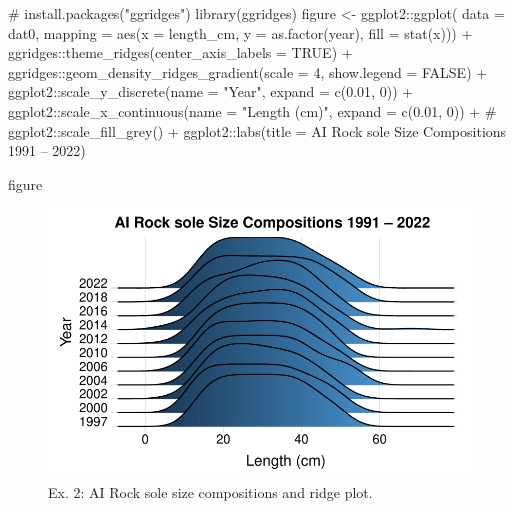 \documentclass[
  letterpaper,
  oneside,
  open=any]{scrbook}
\newenvironment{Shaded}{\begin{snugshade}}{\end{snugshade}}
\newcommand{\AttributeTok}[1]{\textcolor[rgb]{0.40,0.45,0.13}{#1}}
\newcommand{\CommentTok}[1]{\textcolor[rgb]{0.37,0.37,0.37}{#1}}
\newcommand{\ConstantTok}[1]{\textcolor[rgb]{0.56,0.35,0.01}{#1}}
\newcommand{\DecValTok}[1]{\textcolor[rgb]{0.68,0.00,0.00}{#1}}
\newcommand{\FloatTok}[1]{\textcolor[rgb]{0.68,0.00,0.00}{#1}}
\newcommand{\FunctionTok}[1]{\textcolor[rgb]{0.28,0.35,0.67}{#1}}
\newcommand{\NormalTok}[1]{\textcolor[rgb]{0.00,0.23,0.31}{#1}}
\newcommand{\OtherTok}[1]{\textcolor[rgb]{0.00,0.23,0.31}{#1}}
\newcommand{\SpecialCharTok}[1]{\textcolor[rgb]{0.37,0.37,0.37}{#1}}
\newcommand{\StringTok}[1]{\textcolor[rgb]{0.13,0.47,0.30}{#1}}
\begin{document}
\begin{Shaded}
\begin{Highlighting}[]
\CommentTok{\# install.packages("ggridges")}
\FunctionTok{library}\NormalTok{(ggridges)}
\NormalTok{figure }\OtherTok{\textless{}{-}} 
\NormalTok{  ggplot2}\SpecialCharTok{::}\FunctionTok{ggplot}\NormalTok{(}
    \AttributeTok{data =}\NormalTok{ dat0, }
    \AttributeTok{mapping =} \FunctionTok{aes}\NormalTok{(}\AttributeTok{x =}\NormalTok{ length\_cm, }\AttributeTok{y =} \FunctionTok{as.factor}\NormalTok{(year), }\AttributeTok{fill =} \FunctionTok{stat}\NormalTok{(x))) }\SpecialCharTok{+}
\NormalTok{  ggridges}\SpecialCharTok{::}\FunctionTok{theme\_ridges}\NormalTok{(}\AttributeTok{center\_axis\_labels =} \ConstantTok{TRUE}\NormalTok{) }\SpecialCharTok{+} 
\NormalTok{  ggridges}\SpecialCharTok{::}\FunctionTok{geom\_density\_ridges\_gradient}\NormalTok{(}\AttributeTok{scale =} \DecValTok{4}\NormalTok{, }\AttributeTok{show.legend =} \ConstantTok{FALSE}\NormalTok{) }\SpecialCharTok{+} 
\NormalTok{  ggplot2}\SpecialCharTok{::}\FunctionTok{scale\_y\_discrete}\NormalTok{(}\AttributeTok{name =} \StringTok{"Year"}\NormalTok{, }\AttributeTok{expand =} \FunctionTok{c}\NormalTok{(}\FloatTok{0.01}\NormalTok{, }\DecValTok{0}\NormalTok{)) }\SpecialCharTok{+}
\NormalTok{  ggplot2}\SpecialCharTok{::}\FunctionTok{scale\_x\_continuous}\NormalTok{(}\AttributeTok{name =} \StringTok{"Length (cm)"}\NormalTok{, }\AttributeTok{expand =} \FunctionTok{c}\NormalTok{(}\FloatTok{0.01}\NormalTok{, }\DecValTok{0}\NormalTok{)) }\SpecialCharTok{+}
  \CommentTok{\# ggplot2::scale\_fill\_grey() +}
\NormalTok{  ggplot2}\SpecialCharTok{::}\FunctionTok{labs}\NormalTok{(}\AttributeTok{title =} \StringTok{\textquotesingle{}AI Rock sole Size Compositions 1991 – 2022\textquotesingle{}}\NormalTok{) }

\NormalTok{figure}
\end{Highlighting}
\end{Shaded}

\begin{figure}[H]

{\centering \includegraphics{content/akfin-oracle-sql-r_files/figure-pdf/test-2-plot-1.pdf}

}

\caption{Ex. 2: AI Rock sole size compositions and ridge plot.}

\end{figure}
\end{document}
